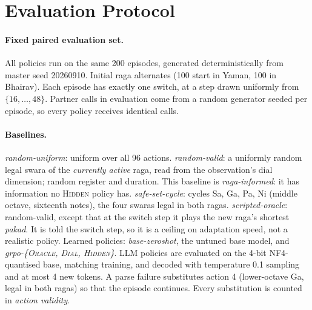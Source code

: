 \documentclass[11pt]{article}
\newcommand{\hidden}{\textsc{Hidden}}
\newcommand{\dial}{\textsc{Dial}}
\newcommand{\oracle}{\textsc{Oracle}}
\newcommand{\sw}[1]{\textit{#1}}  %
\begin{document}
\section{Evaluation Protocol}
\label{sec:protocol}

\paragraph{Fixed paired evaluation set.} All policies run on the same 200 episodes, generated deterministically from master seed 20260910. Initial raga alternates (100 start in Yaman, 100 in Bhairav). Each episode has exactly one switch, at a step drawn uniformly from $\{16,\dots,48\}$. Partner calls in evaluation come from a random generator seeded per episode, so every policy receives identical calls.

\paragraph{Baselines.}
\textit{random-uniform}: uniform over all 96 actions.
\textit{random-valid}: a uniformly random legal swara of the \emph{currently active} raga, read from the observation's dial dimension; random register and duration. This baseline is \emph{raga-informed}: it has information no \hidden{} policy has.
\textit{safe-set-cycle}: cycles Sa, Ga, Pa, Ni (middle octave, sixteenth notes), the four swaras legal in both ragas.
\textit{scripted-oracle}: random-valid, except that at the switch step it plays the new raga's shortest \sw{pakad}. It is told the switch step, so it is a ceiling on adaptation speed, not a realistic policy.
Learned policies: \textit{base-zeroshot}, the untuned base model, and \textit{grpo-\{\oracle, \dial, \hidden\}}. LLM policies are evaluated on the 4-bit NF4-quantised base, matching training, and decoded with temperature 0.1 sampling and at most 4 new tokens. A parse failure substitutes action 4 (lower-octave Ga, legal in both ragas) so that the episode continues. Every substitution is counted in \emph{action validity}.
\end{document}
